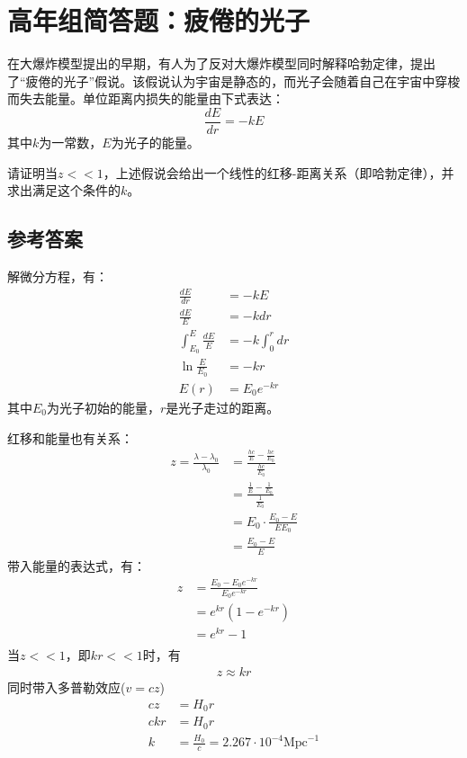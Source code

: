 \documentclass[UTF8]{ctexart}
\numberwithin{equation}{section}
\begin{document}
\section{高年组简答题：疲倦的光子}
在大爆炸模型提出的早期，有人为了反对大爆炸模型同时解释哈勃定律，提出了“疲倦的光子”假说。该假说认为宇宙是静态的，而光子会随着自己在宇宙中穿梭而失去能量。单位距离内损失的能量由下式表达：
\[
\frac{dE}{dr}=-kE
\]
其中$k$为一常数，$E$为光子的能量。

请证明当$z<<1$，上述假说会给出一个线性的红移-距离关系（即哈勃定律），并求出满足这个条件的$k$。

\subsection{参考答案}
解微分方程，有：
\begin{align*}
    \frac{dE}{dr}&=-kE\\
    \frac{dE}{E}&=-k dr\\
    \int_{E_0}^{E} \frac{dE}{E}&= -k \int_{0}^{r} dr\\
    \ln \frac{E}{E_0} &= -kr\\
    E(r) &= E_0 e^{-kr}
\end{align*}
其中$E_0$为光子初始的能量，$r$是光子走过的距离。

红移和能量也有关系：
\begin{align*}
    z = \frac{\lambda - \lambda_0}{\lambda_0} &= \frac{\frac{hc}{E}-\frac{hc}{E_0}}{\frac{hc}{E_0}}\\
    &= \frac{\frac{1}{E}-\frac{1}{E_0}}{\frac{1}{E_0}}\\
    &= E_0\cdot\frac{E_0-E}{EE_0}\\
    &= \frac{E_0 - E}{E}
\end{align*}
带入能量的表达式，有：
\begin{align*}
    z &= \frac{E_0 - E_0 e^{-kr}}{E_0 e^{-kr}}\\
    &= e^{kr}\left(1-e^{-kr}\right)\\
    &= e^{kr} - 1\\
\end{align*}
当$z<<1$，即$kr<<1$时，有
\begin{align*}
    z \approx kr
\end{align*}
同时带入多普勒效应($v = cz$)
\begin{align*}
    cz &= H_0 r\\
    c kr & = H_0 r\\
    k &= \frac{H_0}{c} = 2.267\cdot 10^{-4} \text{Mpc}^{-1}
\end{align*}
\end{document}
